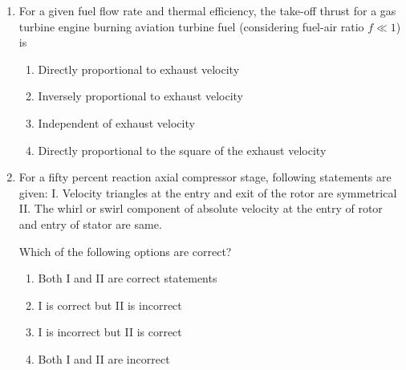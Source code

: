 \documentclass[journal]{IEEEtran}
\begin{document}
\begin{enumerate}
\begin{multicols}{2}
\columnbreak
\textbf{Right column:}
\begin{enumerate}
    \item Ramjet
    \item Turboprop
    \item Turbojet
    \item Turbofan
\end{enumerate}
\end{multicols}

\begin{enumerate}
    \item a -- iv, b -- iii, c -- i, d -- ii
    \item a -- ii, b -- i, c -- iii, d -- iv
    \item a -- i, b -- ii, c -- iv, d -- iii
    \item a -- ii, b -- iv, c -- iii, d -- i
\end{enumerate}
\hfill{}

\item  
For a given fuel flow rate and thermal efficiency, the take-off thrust for a gas turbine engine  
burning aviation turbine fuel (considering fuel-air ratio $f \ll 1$) is  

\begin{enumerate}
    \item Directly proportional to exhaust velocity
    \item Inversely proportional to exhaust velocity
    \item Independent of exhaust velocity
    \item Directly proportional to the square of the exhaust velocity
\end{enumerate}
\hfill{}

\item  
For a fifty percent reaction axial compressor stage, following statements are given:  
I. Velocity triangles at the entry and exit of the rotor are symmetrical  
II. The whirl or swirl component of absolute velocity at the entry of rotor and entry of stator are same.  

Which of the following options are correct?  
\begin{enumerate}
    \item Both I and II are correct statements
    \item I is correct but II is incorrect
    \item I is incorrect but II is correct
    \item Both I and II are incorrect
\end{enumerate}
\hfill{}


\end{enumerate}
\end{document}
